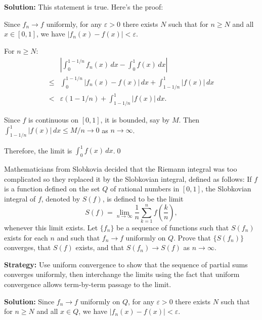 \bigskip\noindent\textbf{Solution:} This statement is true. Here's the proof:

Since \( f_n \to f \) uniformly, for any \( \varepsilon > 0 \) there exists \( N \) such that for \( n \geq N \) and all \( x \in [0, 1] \), we have \( |f_n(x) - f(x)| < \varepsilon \).

For \( n \geq N \):
\begin{align*}
&\left|\int_0^{1 - 1/n} f_n(x) \, dx - \int_0^1 f(x) \, dx\right| \\
\leq & \int_0^{1 - 1/n} |f_n(x) - f(x)| \, dx + \int_{1 - 1/n}^1 |f(x)| \, dx \\
< & \varepsilon(1 - 1/n) + \int_{1 - 1/n}^1 |f(x)| \, dx.
\end{align*}

Since \( f \) is continuous on \([0, 1]\), it is bounded, say by \( M \). Then \( \int_{1 - 1/n}^1 |f(x)| \, dx \leq M/n \to 0 \) as \( n \to \infty \).

Therefore, the limit is \( \int_0^1 f(x) \, dx \).\qed


\begin{problembox}
\begin{problemstatement}
Mathematicians from Slobkovia decided that the Riemann integral was too complicated so they replaced it by the Slobkovian integral, defined as follows: If \( f \) is a function defined on the set \( Q \) of rational numbers in \([0, 1]\), the Slobkovian integral of \( f \), denoted by \( S(f) \), is defined to be the limit
\[S(f) = \lim_{n \to \infty} \frac{1}{n} \sum_{k=1}^n f \left( \frac{k}{n} \right),\]
whenever this limit exists. Let \(\{f_n\}\) be a sequence of functions such that \( S(f_n) \) exists for each \( n \) and such that \( f_n \to f \) uniformly on \( Q \). Prove that \(\{S(f_n)\}\) converges, that \( S(f) \) exists, and that \( S(f_n) \to S(f) \) as \( n \to \infty \).
\end{problemstatement}
\end{problembox}

\noindent\textbf{Strategy:} Use uniform convergence to show that the sequence of partial sums converges uniformly, then interchange the limits using the fact that uniform convergence allows term-by-term passage to the limit.

\bigskip\noindent\textbf{Solution:} Since \( f_n \to f \) uniformly on \( Q \), for any \( \varepsilon > 0 \) there exists \( N \) such that for \( n \geq N \) and all \( x \in Q \), we have \( |f_n(x) - f(x)| < \varepsilon \).

